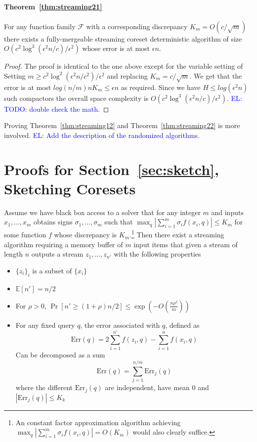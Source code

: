 \documentclass[anon,12pt]{colt2019} %
\newcommand{\el}[1]{\textcolor{blue}{EL: #1}}
\newcommand{\E}{\mathbb{E}}
\newcommand{\eps}{\epsilon}
\newcommand{\F}{\mathcal{F}}
\renewcommand{\Pr}{\operatorname{Pr}}
\begin{document}
\paragraph{Theorem~\ref{thm:streaming21}}
For any function family $\F$ with a corresponding discrepancy $K_m = O(c/\sqrt{m})$ there exists a fully-mergeable streaming coreset deterministic algorithm of size $O\left(c^2\log^3(\eps^2 n/c) /\eps^2\right)$ whose error is at most $\eps n$. 
\begin{proof}
The proof is identical to the one above except for the variable setting of
Setting $m \ge c^2\log^2(\eps^2 n/c^2)/\eps^2$ and replacing $K_m = c/\sqrt{m}$. 
We get that the error is at most $log(n/m) n K_m \le \eps n$ as required. 
Since we have $H \le log(\eps^2 n)$ such compactors the overall space complexity is $O\left(c^2\log^3(\eps^2 n/c) /\eps^2\right)$. \el{TODO: double check the math.}
\end{proof}

Proving Theorem~\ref{thm:streaming12} and Theorem~\ref{thm:streaming22} is more involved. 
\el{Add the description of the randomized algorithms.}

\section{Proofs for Section~\ref{sec:sketch}, Sketching Coresets} \label{app:sketch proof}

\begin{lemma} \label{lem:compactor}
Assume we have black box access to a solver that for any integer $m$ and inputs $x_1,\ldots,x_m$ obtains signs $\sigma_1,\ldots,\sigma_m$ such that $\max_q \left| \sum_{i=1}^{m} \sigma_i f(x_i, q)\right| \leq K_m$ for some function $f$ whose discrepancy is $K_m$.\footnote{An constant factor approximation algorithm achieving $\max_q \left| \sum_{i=1}^{m} \sigma_i f(x_i, q)\right| = O(K_m)$ would also clearly suffice.} 
Then there exist a streaming algorithm requiring a memory buffer of $m$ input items that given a stream of length $n$ outputs a stream $z_1,\ldots,z_{n'}$ with the following properties
\begin{itemize}
\item $\{z_i\}_i$ is a subset of $\{x_i\}$
\item $\E[n'] = n/2$
\item For $\rho >0$, $\Pr[n' \geq (1+\rho)n/2] \leq \exp \left( -O\left(\frac{n\rho^2}{m}\right)\right)$
\item For any fixed query $q$, the error associated with $q$, defined as
$$\text{Err}(q) = 2\sum_{i=1}^{n'} f(z_i,q) - \sum_{i=1}^n f(x_i,q)  $$
Can be decomposed as a sum
$$\text{Err}(q) = \sum_{j=1}^{n/m} \text{Err}_j(q)$$
where the different $\text{Err}_j(q)$ are independent, have mean 0 and $|\text{Err}_j(q)| \leq K_k$
\end{itemize}
\end{lemma}
\end{document}
